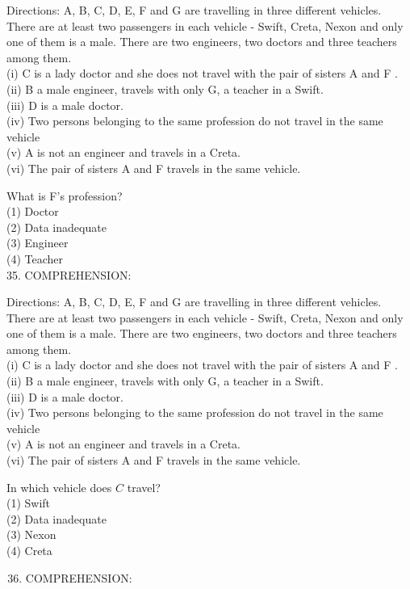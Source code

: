 \documentclass[10pt]{article}
\begin{document}
Directions: A, B, C, D, E, F and G are travelling in three different vehicles. There are at least two passengers in each vehicle - Swift, Creta, Nexon and only one of them is a male. There are two engineers, two doctors and three teachers among them.\\
(i) C is a lady doctor and she does not travel with the pair of sisters A and F .\\
(ii) B a male engineer, travels with only G, a teacher in a Swift.\\
(iii) D is a male doctor.\\
(iv) Two persons belonging to the same profession do not travel in the same vehicle\\
(v) A is not an engineer and travels in a Creta.\\
(vi) The pair of sisters A and F travels in the same vehicle.

What is F's profession?\\
(1) Doctor\\
(2) Data inadequate\\
(3) Engineer\\
(4) Teacher\\
35. COMPREHENSION:

Directions: A, B, C, D, E, F and G are travelling in three different vehicles. There are at least two passengers in each vehicle - Swift, Creta, Nexon and only one of them is a male. There are two engineers, two doctors and three teachers among them.\\
(i) C is a lady doctor and she does not travel with the pair of sisters A and F .\\
(ii) B a male engineer, travels with only G, a teacher in a Swift.\\
(iii) D is a male doctor.\\
(iv) Two persons belonging to the same profession do not travel in the same vehicle\\
(v) A is not an engineer and travels in a Creta.\\
(vi) The pair of sisters A and F travels in the same vehicle.

In which vehicle does $C$ travel?\\
(1) Swift\\
(2) Data inadequate\\
(3) Nexon\\
(4) Creta\\

\begin{enumerate}
  \setcounter{enumi}{35}
  \item COMPREHENSION:
\end{enumerate}
\end{document}
